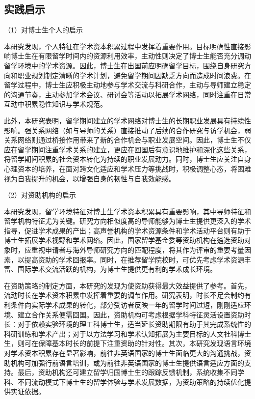\subsection{实践启示}

（1）对博士生个人的启示

本研究发现，个人特征在学术资本积累过程中发挥着重要作用。目标明确性直接影响博士生在有限留学时间内的资源利用效率，主动性则决定了博士生能否充分调动留学环境中的学术资源。因此，博士生在出国前应明确留学目标，围绕自身研究方向和职业规划制定清晰的学术计划，避免留学期间因缺乏方向而造成时间浪费。在留学过程中，博士生应积极主动地参与学术交流与科研合作，主动与导师建立稳定的沟通节奏，主动参加学术会议、研讨会等活动以拓展学术网络，同时注重在日常互动中积累隐性知识与学术规范。

此外，本研究表明，留学期间建立的学术网络对博士生的长期职业发展具有持续性影响。强关系网络（如与导师的关系）直接推动了后续的合作研究与访学机会，弱关系网络则通过桥接作用带来了新的合作机会与职业发展空间。因此，博士生不仅应在留学期间注重学术关系的建立，更应在回国后有意识地维护和深化这些关系，将留学期间积累的社会资本转化为持续的职业发展动力。同时，博士生应关注自身心理资本的培养，在面对跨文化适应和学术压力等挑战时，积极调整心态，将困难视为自我提升的机会，以增强自身的韧性与自我效能感。

（2）对资助机构的启示

本研究发现，留学环境特征对博士生学术资本积累具有重要影响，其中导师特征和留学机构特征尤为关键。研究方向相似度高的导师能够为博士生提供更深入的学术指导，促进学术成果的产出；高声誉机构的学术资源条件和学术活动平台则有助于博士生拓展学术视野和学术网络。因此，国家留学基金委等资助机构在遴选资助对象时，应重视申请者与海外导师研究方向的匹配程度，将其作为评审的重要考量因素，以提高资助的学术回报率。同时，在推荐留学院校时，可优先考虑学术资源丰富、国际学术交流活跃的机构，为博士生提供更有利的学术成长环境。

在资助策略的制定方面，本研究的发现为使资助获得最大效益提供了参考。首先，流动时长在学术资本积累中发挥着重要的调节作用。研究表明，时长不足会制约有利条件向实际学术成果的转化，部分受访者反映一年的留学时间过短，刚刚适应环境、建立合作关系便需回国。因此，资助机构可考虑根据学科特征灵活设置资助时长：对于依赖实验环境的理工科博士生，适当延长资助期限有助于其完成系统性的科研训练和学术产出；对于以方法学习和学术认知拓展为主要目标的人文社科博士生，则可在保障基本时长的前提下注重资助的针对性。其次，本研究发现语言环境对学术资本积累存在显著影响，前往非英语国家的博士生面临更大的沟通挑战，资助机构可加强行前语言培训，或为前往非英语国家的博士生提供语言适应方面的支持。最后，资助机构还可建立留学归国博士生的跟踪反馈机制，系统收集不同学科、不同流动模式下博士生的留学体验与学术发展数据，为资助策略的持续优化提供实证依据。

